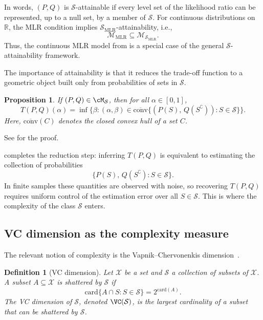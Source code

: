 \documentclass[english]{article}
\theoremstyle{plain}
\newtheorem{definition}{Definition}[section]
\newtheorem{proposition}{Proposition}[section]
\theoremstyle{definition}
\newcommand{\Toff}[2]{T(#1,#2)}
\newcommand{\convclosure}{\overline{\mathrm{conv}}}
\newcommand{\smlr}{\mathcal{S}_{\mathrm{MLR}}}     %
\begin{document}
\noindent In words, $(P,Q)$ is $\mathcal S$-attainable if every level set of
the likelihood ratio can be represented, up to a null set, by a member of
$\mathcal S$. For continuous distributions on \(\mathbb{R}\), the MLR
condition implies \(\smlr\)-attainability, i.e.,
\[
\mathcal M_{\mathrm{MLR}} \subseteq \mathcal M_{\smlr}.
\]
Thus, the continuous MLR model from  is a special case of
the general \(\mathcal S\)-attainability framework.

The importance of attainability is that it reduces the trade-off function to a
geometric object built only from probabilities of sets in \(\mathcal S\).

\begin{proposition}\label{prop:reduction}
If $(P,Q) \in \cM_{\mathcal S}$, then for all $\alpha \in [0,1]$,
\[
\Toff{P}{Q}(\alpha)
=
\inf\Big\{\beta : (\alpha, \beta) \in \convclosure\big\{(P(S),\, Q(S^{\complement})) : S \in \mathcal S\big\}\Big\}.
\]
Here, $\convclosure(C)$ denotes the closed convex hull of a set $C$.
\end{proposition}

\noindent See  for the proof.
\medskip

 completes the reduction step: inferring
$\Toff{P}{Q}$ is equivalent to estimating the collection of probabilities
\[
\{P(S),\, Q(S^{\complement}) : S \in \mathcal S\}.
\]
In finite samples these quantities are observed with noise, so recovering
$\Toff{P}{Q}$ requires uniform control of the estimation error over all
$S \in \mathcal S$. This is where the complexity of the class \(\mathcal S\)
enters.

\subsection{VC dimension as the complexity measure}

The relevant notion of complexity is the Vapnik--Chervonenkis
dimension~\cite{vapnik2015uniform}.

\begin{definition}[VC dimension]\label{def:vc}
Let $\mathcal X$ be a set and $\mathcal S$ a collection of subsets of
$\mathcal X$. A subset $A \subseteq \mathcal X$ is \emph{shattered} by
$\mathcal S$ if
\[
\mathrm{card}\{A \cap S : S \in \mathcal S\}
=
2^{\mathrm{card}(A)}.
\]
The \emph{VC dimension} of $\mathcal S$, denoted $\VC(\mathcal S)$, is the
largest cardinality of a subset that can be shattered by $\mathcal S$.
\end{definition}
\end{document}
